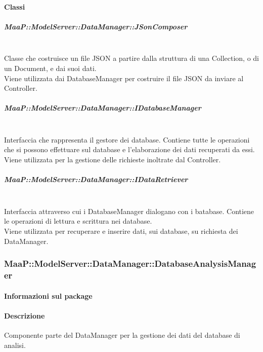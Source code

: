 \paragraph{Classi}
\subparagraph{MaaP::ModelServer::DataManager::JSonComposer}
\\
Classe che costruisce un file JSON a partire dalla struttura di una Collection, o di un Document, e dai suoi dati.\\
Viene utilizzata dai DatabaseManager per costruire il file JSON da inviare al Controller.

\subparagraph{MaaP::ModelServer::DataManager::IDatabaseManager}
\\
Interfaccia che rappresenta il gestore dei database. Contiene tutte le operazioni che si possono effettuare sul database e l'elaborazione dei dati recuperati da essi.\\
Viene utilizzata per la gestione delle richieste inoltrate dal Controller.

\subparagraph{MaaP::ModelServer::DataManager::IDataRetriever}
\\
Interfaccia attraverso cui i DatabaseManager dialogano con i batabase. Contiene le operazioni di lettura e scrittura nei database.\\
Viene utilizzata per recuperare e inserire dati, sui database, su richiesta dei DataManager.

\subsubsection{MaaP::ModelServer::DataManager::DatabaseAnalysisManager}
\paragraph{Informazioni sul package}
\paragraph{Descrizione}
Componente parte del DataManager per la gestione dei dati del database di analisi.
